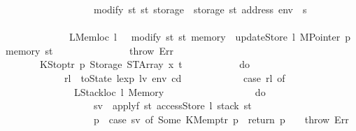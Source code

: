 \begin{isabellebody}
\ \ \ \ \ \ \ \ \ \ \ \ \ \ \ \ \ \ modify\ {\isacharparenleft}{\kern0pt}{\isasymlambda}st{\isachardot}{\kern0pt}\ st\ {\isasymlparr}storage\ {\isacharcolon}{\kern0pt}{\isacharequal}{\kern0pt}\ {\isacharparenleft}{\kern0pt}storage\ st{\isacharparenright}{\kern0pt}\ {\isacharparenleft}{\kern0pt}address\ env\ {\isacharcolon}{\kern0pt}{\isacharequal}{\kern0pt}\ s{\isacharparenright}{\kern0pt}{\isasymrparr}{\isacharparenright}{\kern0pt}\isanewline
\ \ \ \ \ \ \ \ \ \ \ \ \ \ \ \ {\isacharbraceright}{\kern0pt}\isanewline
\ \ \ \ \ \ \ \ \ \ \ \ {\isacharbar}{\kern0pt}\ {\isacharparenleft}{\kern0pt}LMemloc\ l{\isacharcomma}{\kern0pt}\ {\isacharunderscore}{\kern0pt}{\isacharparenright}{\kern0pt}\ {\isasymRightarrow}\ modify\ {\isacharparenleft}{\kern0pt}{\isasymlambda}st{\isachardot}{\kern0pt}\ st\ {\isasymlparr}memory\ {\isacharcolon}{\kern0pt}{\isacharequal}{\kern0pt}\ updateStore\ l\ {\isacharparenleft}{\kern0pt}MPointer\ p{\isacharparenright}{\kern0pt}\ {\isacharparenleft}{\kern0pt}memory\ st{\isacharparenright}{\kern0pt}{\isasymrparr}{\isacharparenright}{\kern0pt}\isanewline
\ \ \ \ \ \ \ \ \ \ \ \ {\isacharbar}{\kern0pt}\ {\isacharunderscore}{\kern0pt}\ {\isasymRightarrow}\ throw\ Err\isanewline
\ \ \ \ \ \ \ \ \ \ {\isacharbraceright}{\kern0pt}\isanewline
\ \ \ \ \ \ {\isacharbar}{\kern0pt}\ {\isacharparenleft}{\kern0pt}KStoptr\ p{\isacharcomma}{\kern0pt}\ Storage\ {\isacharparenleft}{\kern0pt}STArray\ x\ t{\isacharparenright}{\kern0pt}{\isacharparenright}{\kern0pt}\ {\isasymRightarrow}\isanewline
\ \ \ \ \ \ \ \ \ \ do\ {\isacharbraceleft}{\kern0pt}\isanewline
\ \ \ \ \ \ \ \ \ \ \ \ rl\ {\isasymleftarrow}\ toState\ {\isacharparenleft}{\kern0pt}lexp\ lv\ env\ cd{\isacharparenright}{\kern0pt}{\isacharsemicolon}{\kern0pt}\isanewline
\ \ \ \ \ \ \ \ \ \ \ \ case\ rl\ of\isanewline
\ \ \ \ \ \ \ \ \ \ \ \ \ \ {\isacharparenleft}{\kern0pt}LStackloc\ l{\isacharcomma}{\kern0pt}\ Memory\ {\isacharunderscore}{\kern0pt}{\isacharparenright}{\kern0pt}\ {\isasymRightarrow}\isanewline
\ \ \ \ \ \ \ \ \ \ \ \ \ \ \ \ do\ {\isacharbraceleft}{\kern0pt}\isanewline
\ \ \ \ \ \ \ \ \ \ \ \ \ \ \ \ \ \ sv\ {\isasymleftarrow}\ applyf\ {\isacharparenleft}{\kern0pt}{\isasymlambda}st{\isachardot}{\kern0pt}\ accessStore\ l\ {\isacharparenleft}{\kern0pt}stack\ st{\isacharparenright}{\kern0pt}{\isacharparenright}{\kern0pt}{\isacharsemicolon}{\kern0pt}\isanewline
\ \ \ \ \ \ \ \ \ \ \ \ \ \ \ \ \ \ p{\isacharprime}{\kern0pt}\ {\isasymleftarrow}\ case\ sv\ of\ Some\ {\isacharparenleft}{\kern0pt}KMemptr\ p{\isacharprime}{\kern0pt}{\isacharparenright}{\kern0pt}\ {\isasymRightarrow}\ return\ p{\isacharprime}{\kern0pt}\ {\isacharbar}{\kern0pt}\ {\isacharunderscore}{\kern0pt}\ {\isasymRightarrow}\ throw\ Err{\isacharsemicolon}{\kern0pt}\isanewline

\end{isabellebody}
